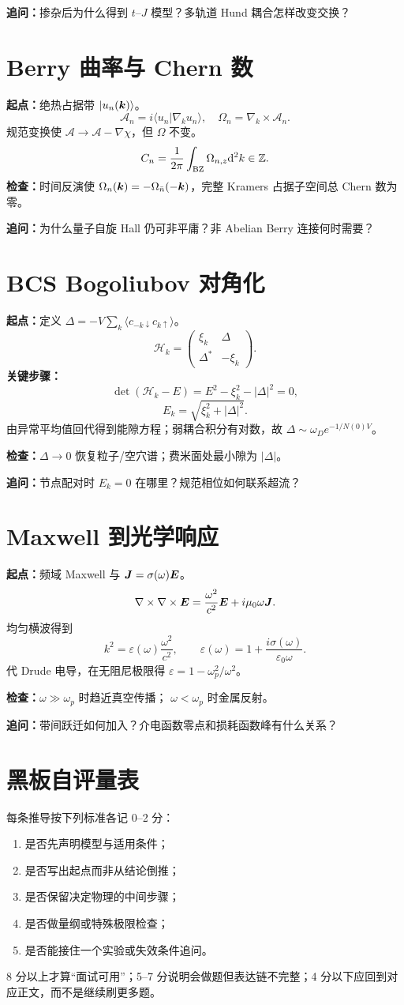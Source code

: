 \textbf{追问：}掺杂后为什么得到 $t$--$J$ 模型？多轨道 Hund 耦合怎样改变交换？

\section{Berry 曲率与 Chern 数}
\textbf{起点：}绝热占据带 $|u_n(\bm{k})\rangle$。
\[
\mathcal A_n=i\langle u_n|\nabla_k u_n\rangle,\quad
\Omega_n=\nabla_k\times\mathcal A_n.
\]
规范变换使 $\mathcal A\to\mathcal A-\nabla\chi$，但
$\Omega$ 不变。
\[
C_n=\frac1{2\pi}\int_{\rm BZ}\Omega_{n,z}\mathrm d^2k\in\mathbb Z.
\]
\textbf{检查：}时间反演使
$\Omega_n(\bm{k})=-\Omega_{\bar n}(-\bm{k})$，完整 Kramers 占据子空间总 Chern 数为零。

\textbf{追问：}为什么量子自旋 Hall 仍可非平庸？非 Abelian Berry 连接何时需要？

\section{BCS Bogoliubov 对角化}
\textbf{起点：}定义
$\Delta=-V\sum_k\langle c_{-k\downarrow}c_{k\uparrow}\rangle$。
\[
\mathcal H_k=
\begin{pmatrix}\xi_k&\Delta\\\Delta^*&-\xi_k\end{pmatrix}.
\]
\textbf{关键步骤：}
\[
\det(\mathcal H_k-E)=E^2-\xi_k^2-|\Delta|^2=0,
\]
\[
E_k=\sqrt{\xi_k^2+|\Delta|^2}.
\]
由异常平均值回代得到能隙方程；弱耦合积分有对数，故
$\Delta\sim\omega_D e^{-1/N(0)V}$。

\textbf{检查：}$\Delta\to0$ 恢复粒子/空穴谱；费米面处最小隙为 $|\Delta|$。

\textbf{追问：}节点配对时 $E_k=0$ 在哪里？规范相位如何联系超流？

\section{Maxwell 到光学响应}
\textbf{起点：}频域 Maxwell 与
$\bm{J}=\sigma(\omega)\bm{E}$。
\[
\nabla\times\nabla\times\bm{E}
=\frac{\omega^2}{c^2}\bm{E}+i\mu_0\omega\bm{J}.
\]
均匀横波得到
\[
k^2=\varepsilon(\omega)\frac{\omega^2}{c^2},
\qquad
\varepsilon(\omega)=1+\frac{i\sigma(\omega)}
{\varepsilon_0\omega}.
\]
代 Drude 电导，在无阻尼极限得
$\varepsilon=1-\omega_p^2/\omega^2$。

\textbf{检查：}$\omega\gg\omega_p$ 时趋近真空传播；
$\omega<\omega_p$ 时金属反射。

\textbf{追问：}带间跃迁如何加入？介电函数零点和损耗函数峰有什么关系？

\section{黑板自评量表}
每条推导按下列标准各记 0--2 分：
\begin{enumerate}
\item 是否先声明模型与适用条件；
\item 是否写出起点而非从结论倒推；
\item 是否保留决定物理的中间步骤；
\item 是否做量纲或特殊极限检查；
\item 是否能接住一个实验或失效条件追问。
\end{enumerate}
8 分以上才算“面试可用”；5--7 分说明会做题但表达链不完整；4 分以下应回到对应正文，而不是继续刷更多题。


